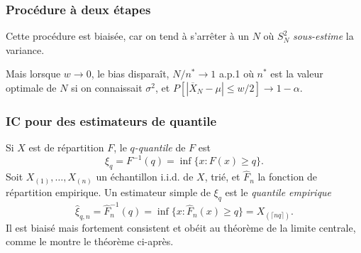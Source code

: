 \documentclass[t,usepdftitle=false]{beamer}
\def\iid{i.i.d.}
\def\toas{\mbox{ to as }}
\def\To{\overset{D}{\to}}
\begin{document}
\begin{frame}
\frametitle{Procédure à deux étapes}

Cette procédure est biaisée, car on tend à s'arrêter à un
$N$ où $S_N^2$ \emph{sous-estime} la variance.  

\mbox{}

Mais lorsque $w\to 0$, le bias disparaît, 
$N/n^* \to 1$ a.p.1
où ${n^*}$ est la valeur optimale de $N$ si on connaissait $\sigma^2$,
et $P[|\overline{X}_N - \mu| \le w/2] \to 1-\alpha$.

\end{frame}

\begin{frame}
\frametitle{IC pour des estimateurs de quantile}

Si ${X}$ est de répartition ${F}$, le
\emph{$q$-quantile} de $F$ est 
\[
  {\xi_q} = F^{-1}(q) = \inf\{x : F(x) \ge {q}\}.
\]
Soit $X_{(1)},\dots,X_{(n)}$ un échantillon \iid{} de $X$, trié,
et $\hat F_n$ la fonction de répartition empirique.
Un estimateur simple de $\xi_q$ est le \emph{quantile empirique}
\[
  {\hat\xi_{q,n}} = \hat F_n^{-1}(q) = \inf\{x : \hat F_n(x) \ge q\}
            = X_{(\lceil nq\rceil)}.
\]
Il est biaisé mais fortement consistent et obéit au théorème de la
limite centrale, comme le montre le théorème ci-après.

\end{frame}

\end{document}
